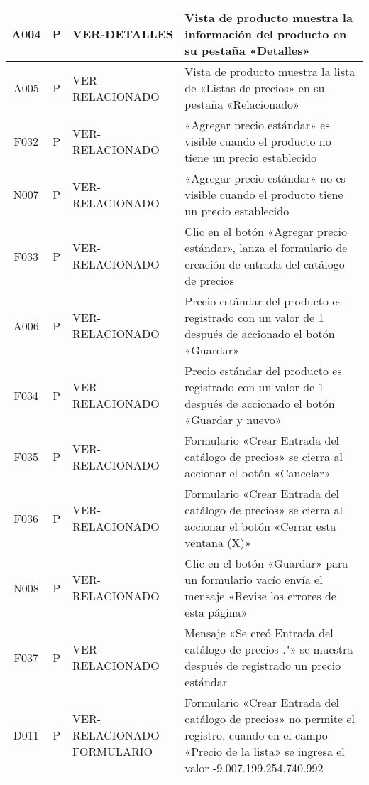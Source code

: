 \begin{landscape}
{\begin{longtable}[htb]{|c|c|p{3.8cm}|p{15.2cm}|}
\scriptsize{A004} & \scriptsize{P} & \scriptsize{VER-DETALLES} & \scriptsize{Vista de producto muestra la información del producto en su pestaña «Detalles»} \\ \hline
\scriptsize{A005} & \scriptsize{P} & \scriptsize{VER-RELACIONADO} & \scriptsize{Vista de producto muestra la lista de «Listas de precios» en su pestaña «Relacionado»} \\ \hline
\scriptsize{F032} & \scriptsize{P} & \scriptsize{VER-RELACIONADO} & \scriptsize{«Agregar precio estándar» es visible cuando el producto no tiene un precio establecido} \\ \hline
\scriptsize{N007} & \scriptsize{P} & \scriptsize{VER-RELACIONADO} & \scriptsize{«Agregar precio estándar» no es visible cuando el producto tiene un precio establecido} \\ \hline
\scriptsize{F033} & \scriptsize{P} & \scriptsize{VER-RELACIONADO} & \scriptsize{Clic en el botón «Agregar precio estándar», lanza el formulario de creación de entrada del catálogo de precios} \\ \hline
\scriptsize{A006} & \scriptsize{P} & \scriptsize{VER-RELACIONADO} & \scriptsize{Precio estándar del producto es registrado con un valor de 1 después de accionado el botón «Guardar»} \\ \hline
\scriptsize{F034} & \scriptsize{P} & \scriptsize{VER-RELACIONADO} & \scriptsize{Precio estándar del producto es registrado con un valor de 1 después de accionado el botón «Guardar y nuevo»} \\ \hline
\scriptsize{F035} & \scriptsize{P} & \scriptsize{VER-RELACIONADO} & \scriptsize{Formulario «Crear Entrada del catálogo de precios» se cierra al accionar el botón «Cancelar»} \\ \hline
\scriptsize{F036} & \scriptsize{P} & \scriptsize{VER-RELACIONADO} & \scriptsize{Formulario «Crear Entrada del catálogo de precios» se cierra al accionar el botón «Cerrar esta ventana (X)»} \\ \hline
\scriptsize{N008} & \scriptsize{P} & \scriptsize{VER-RELACIONADO} & \scriptsize{Clic en el botón «Guardar» para un formulario vacío envía el mensaje «Revise los errores de esta página»} \\ \hline
\scriptsize{F037} & \scriptsize{P} & \scriptsize{VER-RELACIONADO} & \scriptsize{Mensaje «Se creó Entrada del catálogo de precios ."» se muestra después de registrado un precio estándar} \\ \hline
\scriptsize{D011} & \scriptsize{P} & \scriptsize{VER-RELACIONADO-FORMULARIO} & \scriptsize{Formulario «Crear Entrada del catálogo de precios» no permite el registro, cuando en el campo «Precio de la lista» se ingresa el valor -9.007.199.254.740.992} \\ \hline

\end{longtable}}
\end{landscape}
